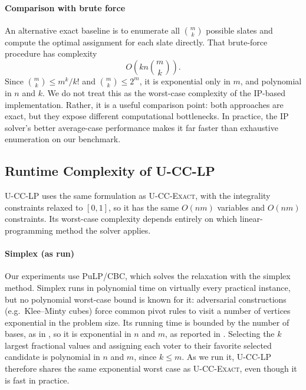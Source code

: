 \documentclass[letterpaper]{article} %
\newcommand{\Exact}{\textsc{U-CC-Exact}}
\newcommand{\LP}{\textsc{U-CC-LP}}
\begin{document}
\paragraph{Comparison with brute force} An alternative exact baseline is to enumerate all \(\binom{m}{k}\) possible slates and compute the optimal assignment for each slate directly.
That brute-force procedure has complexity
\[
O\!\left(k n \binom{m}{k}\right).
\]
Since \(\binom{m}{k}\le m^k/k!\) and \(\binom{m}{k}\le 2^m\), it is exponential only in \(m\), and polynomial in \(n\) and \(k\).
We do not treat this as the worst-case complexity of the IP-based implementation.
Rather, it is a useful comparison point: both approaches are exact, but they expose different computational bottlenecks.
In practice, the IP solver's better average-case performance makes it far faster than exhaustive enumeration on our benchmark.


\subsection{Runtime Complexity of \LP{}}
\label{app:lp-complexity}
\LP{} uses the same formulation as \Exact{}, with the integrality constraints relaxed to $[0,1]$, so it has the same $O(nm)$ variables and $O(nm)$ constraints.
Its worst-case complexity depends entirely on which linear-programming method the solver applies.

\paragraph{Simplex (as run)} Our experiments use PuLP/CBC, which solves the relaxation with the simplex method.
Simplex runs in polynomial time on virtually every practical instance, but no polynomial worst-case bound is known for it: adversarial constructions (e.g.\ Klee--Minty cubes) force common pivot rules to visit a number of vertices exponential in the problem size.
Its running time is bounded by the number of bases, as in , so it is exponential in \(n\) and \(m\), as reported in .
Selecting the \(k\) largest fractional values and assigning each voter to their favorite selected candidate is polynomial in \(n\) and \(m\), since \(k\le m\).
As we run it, \LP{} therefore shares the same exponential worst case as \Exact{}, even though it is fast in practice.
\end{document}
